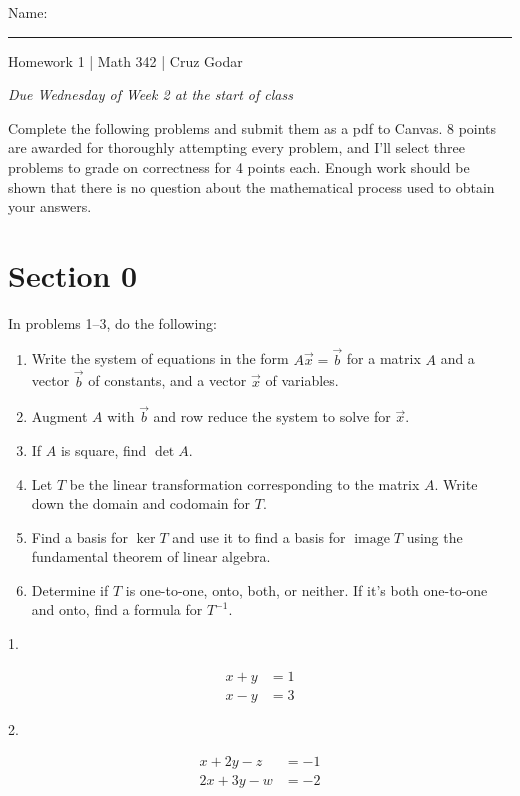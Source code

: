 \documentclass{article}
\begin{document}
\Large Name: \rule{2in}{0.15mm} \hfill Homework 1 | Math 342 | Cruz Godar \vspace{4pt} \normalsize

\textit{Due Wednesday of Week 2 at the start of class}

Complete the following problems and submit them as a pdf to Canvas. 8 points are awarded for thoroughly attempting every problem, and I'll select three problems to grade on correctness for 4 points each. Enough work should be shown that there is no question about the mathematical process used to obtain your answers.

\section{Section 0}

In problems 1--3, do the following:

\begin{enumerate}

	\item Write the system of equations in the form $A\vec{x} = \vec{b}$ for a matrix $A$ and a vector $\vec{b}$ of constants, and a vector $\vec{x}$ of variables.

	\item Augment $A$ with $\vec{b}$ and row reduce the system to solve for $\vec{x}$.

	\item If $A$ is square, find $\det A$.

	\item Let $T$ be the linear transformation corresponding to the matrix $A$. Write down the domain and codomain for $T$.

	\item Find a basis for $\ker T$ and use it to find a basis for $\operatorname{image} T$ using the fundamental theorem of linear algebra.

	\item Determine if $T$ is one-to-one, onto, both, or neither. If it's both one-to-one and onto, find a formula for $T^{-1}$.

\end{enumerate}

1.

\begin{align*}
	x + y &= 1\\
	x - y &= 3
\end{align*}

2.

\begin{align*}
	x + 2y - z &= -1\\
	2x + 3y - w &= -2
\end{align*}
\end{document}
